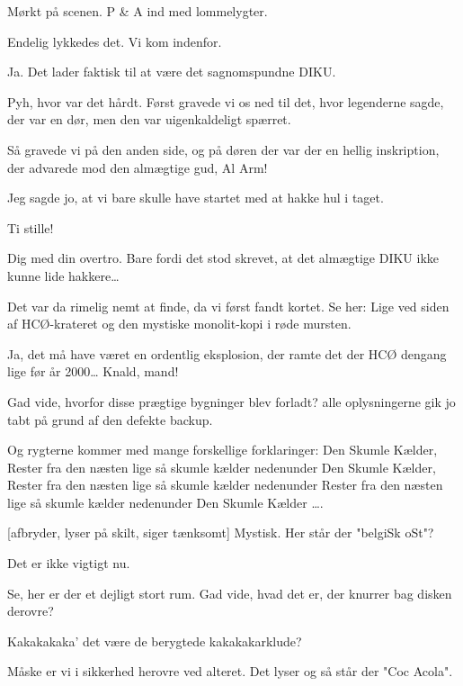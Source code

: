 \documentclass[danish]{article}
\begin{document}
\begin{sketch}

\scene Mørkt på scenen. P \& A ind med lommelygter.

 Endelig lykkedes det. Vi kom indenfor. 

 Ja. Det lader faktisk til at være det sagnomspundne DIKU. 

 Pyh, hvor var det hårdt. Først gravede vi os ned til det, hvor
   legenderne sagde, der var en dør, men den var uigenkaldeligt spærret.

   Så gravede vi på den anden side, og på døren der var der en hellig
   inskription, der advarede mod den almægtige gud, Al Arm!

   Jeg sagde jo, at vi bare skulle have startet med at hakke hul i taget.

 Ti stille!

 Dig med din overtro. Bare fordi det stod skrevet, at det almægtige DIKU
   ikke kunne lide hakkere\ldots{}

 Det var da rimelig nemt
   at finde, da vi først fandt kortet. Se her: Lige
   ved siden af HCØ-krateret og den mystiske monolit-kopi i røde mursten.

 Ja, det må have været en ordentlig eksplosion, der ramte det der HCØ
   dengang lige før år 2000\ldots{} Knald, mand!

  Gad vide, hvorfor disse prægtige
   bygninger blev forladt? alle oplysningerne gik jo tabt på grund af den
   defekte backup.

   Og rygterne kommer med mange forskellige forklaringer: Den Skumle Kælder,
   Rester fra den næsten lige så skumle kælder nedenunder Den Skumle Kælder,
   Rester fra den næsten lige så skumle kælder nedenunder Rester fra den næsten lige så skumle
   kælder nedenunder Den Skumle Kælder \ldots{}.

[afbryder, lyser på skilt, siger tænksomt] Mystisk. Her står der "belgiSk oSt"?

 Det er ikke vigtigt nu. 

 Se, her er der et dejligt stort rum. Gad vide, hvad det er, der knurrer
   bag disken derovre?

 Kakakakaka' det være de berygtede kakakakarklude? 

 Måske er vi i sikkerhed herovre ved alteret. Det lyser og så står der
   "Coc Acola".


\end{sketch}
\end{document}
